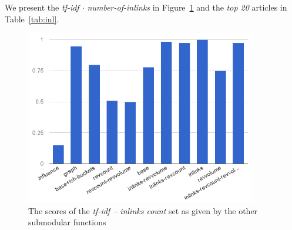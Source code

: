 We present the \emph{tf-idf \(\cdot\) number-of-inlinks} in
Figure~\ref{img:inl} and the \emph{top 20} articles in Table~\ref{tab:inl}.
\begin{figure}
  \centering
  \includegraphics[width=0.9\textwidth,natwidth=555,natheight=419]{images/inl.png}
  \caption{The scores of the \emph{tf-idf -- inlinks count} set as given by the
  other submodular functions}
  \label{img:inl}
\end{figure}

